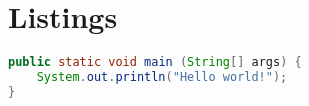 
\chapter{Listings}

\begin{lstlisting}[caption={Java Main-Methode},
    label={lst:java-main-method},
    language={java}]
public static void main (String[] args) {
    System.out.println("Hello world!");
}
\end{lstlisting}